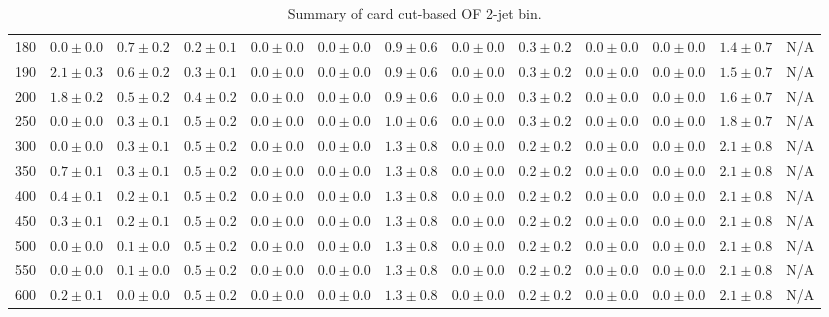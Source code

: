 \begin{table}
{\begin{center}
\begin{tabular}{l | c c | c c c c c c c c  | c c}
180 & $0.0\pm0.0$ & $0.7\pm0.2$ & $0.2\pm0.1$ & $0.0\pm0.0$ & $0.0\pm0.0$ & $0.9\pm0.6$ & $0.0\pm0.0$ & $0.3\pm0.2$ & $0.0\pm0.0$ & $0.0\pm0.0$ & $1.4\pm0.7$ & N/A \\
190 & $2.1\pm0.3$ & $0.6\pm0.2$ & $0.3\pm0.1$ & $0.0\pm0.0$ & $0.0\pm0.0$ & $0.9\pm0.6$ & $0.0\pm0.0$ & $0.3\pm0.2$ & $0.0\pm0.0$ & $0.0\pm0.0$ & $1.5\pm0.7$ & N/A \\
200 & $1.8\pm0.2$ & $0.5\pm0.2$ & $0.4\pm0.2$ & $0.0\pm0.0$ & $0.0\pm0.0$ & $0.9\pm0.6$ & $0.0\pm0.0$ & $0.3\pm0.2$ & $0.0\pm0.0$ & $0.0\pm0.0$ & $1.6\pm0.7$ & N/A \\
250 & $0.0\pm0.0$ & $0.3\pm0.1$ & $0.5\pm0.2$ & $0.0\pm0.0$ & $0.0\pm0.0$ & $1.0\pm0.6$ & $0.0\pm0.0$ & $0.3\pm0.2$ & $0.0\pm0.0$ & $0.0\pm0.0$ & $1.8\pm0.7$ & N/A \\
300 & $0.0\pm0.0$ & $0.3\pm0.1$ & $0.5\pm0.2$ & $0.0\pm0.0$ & $0.0\pm0.0$ & $1.3\pm0.8$ & $0.0\pm0.0$ & $0.2\pm0.2$ & $0.0\pm0.0$ & $0.0\pm0.0$ & $2.1\pm0.8$ & N/A \\
350 & $0.7\pm0.1$ & $0.3\pm0.1$ & $0.5\pm0.2$ & $0.0\pm0.0$ & $0.0\pm0.0$ & $1.3\pm0.8$ & $0.0\pm0.0$ & $0.2\pm0.2$ & $0.0\pm0.0$ & $0.0\pm0.0$ & $2.1\pm0.8$ & N/A \\
400 & $0.4\pm0.1$ & $0.2\pm0.1$ & $0.5\pm0.2$ & $0.0\pm0.0$ & $0.0\pm0.0$ & $1.3\pm0.8$ & $0.0\pm0.0$ & $0.2\pm0.2$ & $0.0\pm0.0$ & $0.0\pm0.0$ & $2.1\pm0.8$ & N/A \\
450 & $0.3\pm0.1$ & $0.2\pm0.1$ & $0.5\pm0.2$ & $0.0\pm0.0$ & $0.0\pm0.0$ & $1.3\pm0.8$ & $0.0\pm0.0$ & $0.2\pm0.2$ & $0.0\pm0.0$ & $0.0\pm0.0$ & $2.1\pm0.8$ & N/A \\
500 & $0.0\pm0.0$ & $0.1\pm0.0$ & $0.5\pm0.2$ & $0.0\pm0.0$ & $0.0\pm0.0$ & $1.3\pm0.8$ & $0.0\pm0.0$ & $0.2\pm0.2$ & $0.0\pm0.0$ & $0.0\pm0.0$ & $2.1\pm0.8$ & N/A \\
550 & $0.0\pm0.0$ & $0.1\pm0.0$ & $0.5\pm0.2$ & $0.0\pm0.0$ & $0.0\pm0.0$ & $1.3\pm0.8$ & $0.0\pm0.0$ & $0.2\pm0.2$ & $0.0\pm0.0$ & $0.0\pm0.0$ & $2.1\pm0.8$ & N/A \\
600 & $0.2\pm0.1$ & $0.0\pm0.0$ & $0.5\pm0.2$ & $0.0\pm0.0$ & $0.0\pm0.0$ & $1.3\pm0.8$ & $0.0\pm0.0$ & $0.2\pm0.2$ & $0.0\pm0.0$ & $0.0\pm0.0$ & $2.1\pm0.8$ & N/A \\
\hline
\end{tabular}
\end{center}
}
\caption{Summary of card cut-based OF 2-jet bin.}
\end{table}
